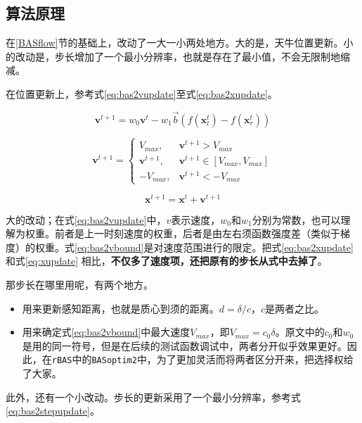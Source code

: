 \documentclass[]{ctexbook}
\providecommand{\tightlist}{%
  \setlength{\itemsep}{0pt}\setlength{\parskip}{0pt}}
\theoremstyle{definition}
\theoremstyle{definition}
\theoremstyle{definition}
\theoremstyle{remark}
\begin{document}
\subsection{算法原理}

在\ref{BASflow}节的基础上，改动了一大一小两处地方。大的是，天牛位置更新。小的改动是，步长增加了一个最小分辨率，也就是存在了最小值，不会无限制地缩减。

在位置更新上，参考式\eqref{eq:bas2vupdate}至式\eqref{eq:bas2xupdate}。

\begin{equation}
\mathbf{v}^{t+1} = w_0\mathbf{v}^t - w_1\overrightarrow{b}(f(\mathbf{x}_l^t)-f(\mathbf{x}_r^t))
\label{eq:bas2vupdate}
\end{equation}

\begin{equation}
\mathbf{v}^{t+1} = \begin{cases} 
V_{max},&\mathbf{v}^{t+1} > V_{max} \\ 
\mathbf{v}^{t+1},  &\mathbf{v}^{t+1} \in [V_{max},V_{max}] \\
-V_{max},&\mathbf{v}^{t+1} <- V_{max}
\end{cases}
\label{eq:bas2vbound}
\end{equation}

\begin{equation}
\mathbf{x}^{t+1} = \mathbf{x}^t+\mathbf{v}^{t+1}
\label{eq:bas2xupdate}
\end{equation}

大的改动；在式\eqref{eq:bas2vupdate}中，\(v\)表示速度，\(w_0\)和\(w_1\)分别为常数，也可以理解为权重。前者是上一时刻速度的权重，后者是由左右须函数强度差（类似于梯度）的权重。式\eqref{eq:bas2vbound}是对速度范围进行的限定。把式\eqref{eq:bas2xupdate}
和式\eqref{eq:xupdate}
相比，\textbf{不仅多了速度项，还把原有的步长从式中去掉了}。

那步长在哪里用呢，有两个地方。

\begin{itemize}
\tightlist
\item
  用来更新感知距离，也就是质心到须的距离。\(d = \delta/c\)，\(c\)是两者之比。
\item
  用来确定式\eqref{eq:bas2vbound}中最大速度\(V_{max}\)，即\(V_{max} = c_0 \delta\)。原文中的\(c_0\)和\(w_0\)是用的同一符号，但是在后续的测试函数调试中，两者分开似乎效果更好。因此，在\texttt{rBAS}中的\texttt{BASoptim2}中，为了更加灵活而将两者区分开来，把选择权给了大家。
\end{itemize}

此外，还有一个小改动。步长的更新采用了一个最小分辨率，参考式\eqref{eq:bas2stepupdate}。
\end{document}

